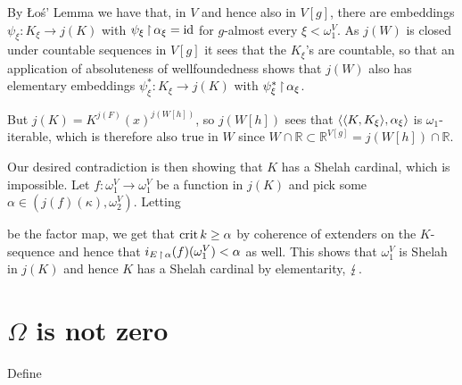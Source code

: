 \documentclass[../../main]{subfiles}
\begin{document}
{{    By \L o\' s' Lemma we have that, in $V$ and hence also in $V[g]$, there are embeddings $\psi_\xi:K_\xi\to j(K)$ with $\psi_\xi\operatorname{\upharpoonright}\alpha_\xi=\operatorname{id}$ for $g$-almost every $\xi<\omega_1^V$. As $j(W)$ is closed under countable sequences in $V[g]$ it sees that the $K_\xi$'s are countable, so that an application of absoluteness of wellfoundedness  shows that $j(W)$ also has elementary embeddings $\psi^*_\xi:K_\xi\to j(K)$ with $\psi^*_\xi\operatorname{\upharpoonright}\alpha_\xi$.

    \qquad But $j(K)=K^{j(F)}(x)^{j(W[h])}$, so $j(W[h])$ sees that $\langle \langle K,K_\xi\rangle,\alpha_\xi\rangle$ is $\omega_1$-iterable, which is therefore also true in $W$ since $W\cap\mathbb R\subset\mathbb R^{V[g]}=j(W[h])\cap\mathbb R$.
  }

  Our desired contradiction is then showing that $K$ has a Shelah cardinal, which is impossible. Let $f:\omega_1^V\to\omega_1^V$ be a function in $j(K)$ and pick some $\alpha\in(j(f)(\kappa),\omega_2^V)$. Letting

  be the factor map, we get that $\operatorname{crit} k\geq\alpha$ by coherence of extenders on the $K$-sequence and hence that $i_{E\operatorname{\upharpoonright}\alpha}(f)(\omega_1^V)<\alpha$ as well. This shows that $\omega_1^V$ is Shelah in $j(K)$ and hence $K$ has a Shelah cardinal by elementarity, $\operatorname{\lightning}$.
}



\section{$\Omega$ is not zero}


Define
\end{document}
